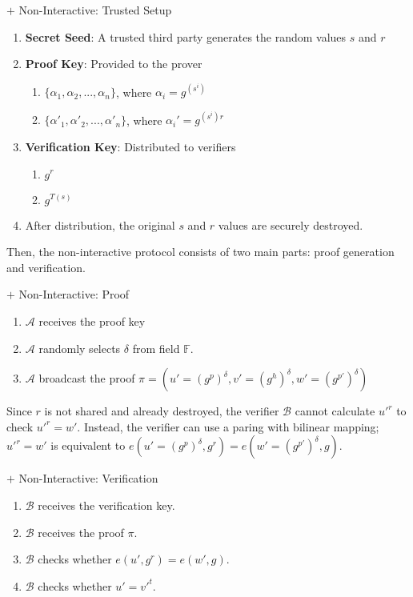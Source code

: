 \documentclass{article}
\begin{document}
\begin{protocol}{$+$ Non-Interactive: Trusted Setup}{}
\begin{enumerate}
    \item \textbf{Secret Seed}: A trusted third party generates the random values $s$ and $r$
    \item \textbf{Proof Key}: Provided to the prover \begin{enumerate}
        \item $\{\alpha_1, \alpha_2, ..., \alpha_{n}\}$, where $\alpha_{i} = g^{(s^i)}$
        \item $\{\alpha'_1, \alpha'_2, ..., \alpha'_{n}\}$, where $\alpha_i' = g^{(s^{i})r}$
        \end{enumerate}
    \item \textbf{Verification Key}: Distributed to verifiers \begin{enumerate}
        \item $g^{r}$
        \item $g^{T(s)}$
    \end{enumerate}
    \item After distribution, the original $s$ and $r$ values are securely destroyed.
\end{enumerate}
\end{protocol}



Then, the non-interactive protocol consists of two main parts: proof generation and verification.

\begin{protocol}{$+$ Non-Interactive: Proof}{}
    \begin{enumerate}
        \item $\mathcal{A}$ receives the proof key
        \item $\mathcal{A}$ randomly selects $\delta$ from field $\mathbb{F}$.
        \item $\mathcal{A}$ broadcast the proof $\pi = (u' = (g^{p})^{\delta}, v' = (g^{h})^{\delta}, w' = (g^{p'})^{\delta})$
    \end{enumerate}
\end{protocol}

Since $r$ is not shared and already destroyed, the verifier $\mathcal{B}$ cannot calculate $u'^{r}$ to check $u'^{r} = w'$. Instead, the verifier can use a paring with bilinear mapping; $u'^{r} = w'$ is equivalent to $e(u' = (g^{p})^{\delta}, g^{r}) = e(w'=(g^{p'})^{\delta}, g)$.

\begin{protocol}{$+$ Non-Interactive: Verification}{}
    \begin{enumerate}
        \item $\mathcal{B}$ receives the verification key.
        \item $\mathcal{B}$ receives the proof $\pi$.
        \item $\mathcal{B}$ checks whether $e(u', g^{r}) = e(w', g)$.
        \item $\mathcal{B}$ checks whether $u' = v'^{t}$.
    \end{enumerate}
\end{protocol}
\end{document}
